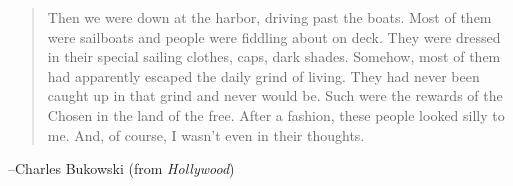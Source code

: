 \documentclass{exam}
\begin{document}
  \else
    \vspace{5 cm}

    \begin{quote}
      \begin{em}
        Then we were down at the harbor, driving past the boats.  Most of them were sailboats and people were fiddling
        about on deck.  They were dressed in their special sailing clothes, caps, dark shades.  Somehow, most of them
        had apparently escaped the daily grind of living.  They had never been caught up in that grind and never would
        be.  Such were the rewards of the Chosen in the land of the free.  After a fashion, these people looked silly to
        me.  And, of course, I wasn't even in their thoughts.
      \end{em}
    \end{quote}
    \hspace{1 cm} --Charles Bukowski (from {\em Hollywood})
  \fi
\end{document}
